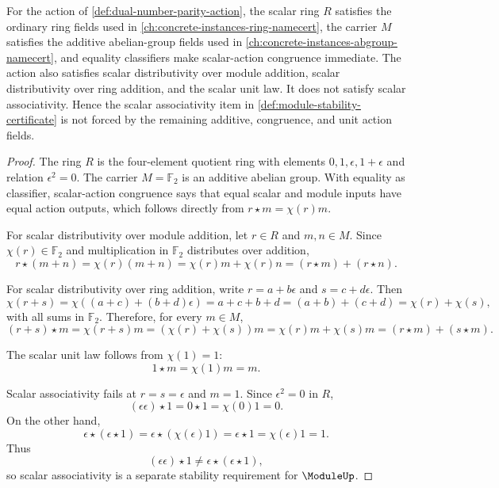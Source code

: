 \begin{proposition}
\label{prop:module-associativity-boundary-additive-unit-action-laws}
For the action of \autoref{def:dual-number-parity-action}, the scalar ring $R$ satisfies the ordinary ring fields used in \autoref{ch:concrete-instances-ring-namecert}, the carrier $M$ satisfies the additive abelian-group fields used in \autoref{ch:concrete-instances-abgroup-namecert}, and equality classifiers make scalar-action congruence immediate. The action also satisfies scalar distributivity over module addition, scalar distributivity over ring addition, and the scalar unit law. It does not satisfy scalar associativity. Hence the scalar associativity item in \autoref{def:module-stability-certificate} is not forced by the remaining additive, congruence, and unit action fields.
\end{proposition}
\begin{proof}
The ring $R$ is the four-element quotient ring with elements $0,1,\epsilon,1+\epsilon$ and relation $\epsilon^2=0$. The carrier $M=\mathbb F_2$ is an additive abelian group. With equality as classifier, scalar-action congruence says that equal scalar and module inputs have equal action outputs, which follows directly from $r\star m=\chi(r)m$.

For scalar distributivity over module addition, let $r\in R$ and $m,n\in M$. Since $\chi(r)\in\mathbb F_2$ and multiplication in $\mathbb F_2$ distributes over addition,
$$
r\star(m+n)=\chi(r)(m+n)=\chi(r)m+\chi(r)n=(r\star m)+(r\star n).
$$

For scalar distributivity over ring addition, write $r=a+b\epsilon$ and $s=c+d\epsilon$. Then
$$
\chi(r+s)=\chi((a+c)+(b+d)\epsilon)=a+c+b+d=(a+b)+(c+d)=\chi(r)+\chi(s),
$$
with all sums in $\mathbb F_2$. Therefore, for every $m\in M$,
$$
(r+s)\star m=\chi(r+s)m=(\chi(r)+\chi(s))m=\chi(r)m+\chi(s)m=(r\star m)+(s\star m).
$$

The scalar unit law follows from $\chi(1)=1$:
$$
1\star m=\chi(1)m=m.
$$

Scalar associativity fails at $r=s=\epsilon$ and $m=1$. Since $\epsilon^2=0$ in $R$,
$$
(\epsilon\epsilon)\star 1=0\star 1=\chi(0)1=0.
$$
On the other hand,
$$
\epsilon\star(\epsilon\star 1)=\epsilon\star(\chi(\epsilon)1)=\epsilon\star 1=\chi(\epsilon)1=1.
$$
Thus
$$
(\epsilon\epsilon)\star 1\neq \epsilon\star(\epsilon\star 1),
$$
so scalar associativity is a separate stability requirement for $\ModuleUp$.
\end{proof}

